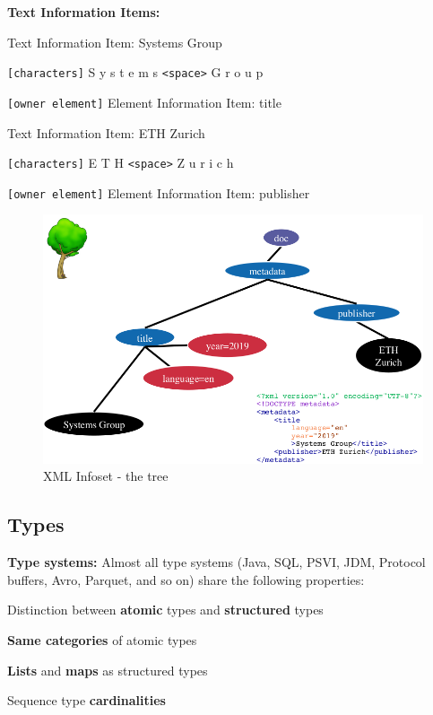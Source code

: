 \documentclass[11pt,oneside,a4paper]{article}
\begin{document}
\textbf{Text Information Items:}
\vspace{-\topsep}
\begin{multicols}{2}
	\begin{compactitem}
		\item Text Information Item: Systems Group
		\item \verb|[characters]| S y s t e m s \verb|<space>| G r o u p
		\item \verb|[owner element]| Element Information Item: title
		
		\item Text Information Item: ETH Zurich
		\item \verb|[characters]| E T H \verb|<space>| Z u r i c h
		\item \verb|[owner element]| Element Information Item: publisher
	\end{compactitem}
\end{multicols}
\vspace{-\topsep}

\begin{figure}[hb!]
	\centering
	\includegraphics[width=0.39\linewidth]{figures/xml_infoset_tree}
	\caption{XML Infoset - the tree}
	\label{fig:xmlinfosettree}
\end{figure}

\subsection{Types}

\textbf{Type systems:} Almost all type systems (Java, SQL, PSVI, JDM, Protocol buffers, Avro, Parquet, and so on) share the following properties:

\begin{compactitem}
	\item Distinction between \textbf{atomic} types and \textbf{structured} types
	\item \textbf{Same categories} of atomic types
	\item \textbf{Lists} and \textbf{maps} as structured types
	\item Sequence type \textbf{cardinalities}
\end{compactitem}
\end{document}
